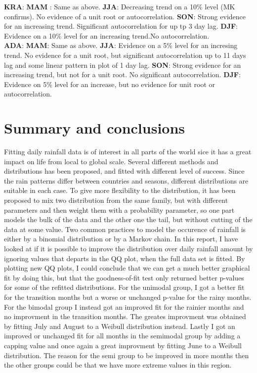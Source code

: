 \documentclass{article}
\begin{document}
	{\Large\textbf{KRA}}: \textbf{MAM} : Same as above. \textbf{JJA}: Decreasing trend on a 10\% level (MK confirms). No evidence of a unit root or autocorrelation. \textbf{SON}: Strong evidence for an increasing trend. Significant autocorrelation for up tp 3 day lag. \textbf{DJF}: Evidence on a 10\% level for an increasing trend.No autocorrelation. \\
	
	{\Large\textbf{ADA}}: \textbf{MAM}: Same as above. \textbf{JJA}: Evidence on a 5\% level for an incresing trend. No evidence for a unit root, but significant autocorrelation up to 11 days lag and some linear pattern in plot of 1 day lag. \textbf{SON}: Strong evidence for an increasing trend, but not for a unit root. No significant autocorrelation. \textbf{DJF}: Evidence on 5\% level for an increase, but no evidence for unit root or autocorrelation.  
	

	\section{Summary and conclusions}
	Fitting daily rainfall data is of interest in all parts of the world sice it has a great impact on life from local to global scale. Several different methods and distributions has been proposed, and fitted with different level of success. Since the rain patterns differ between countries and seasons, different distributions are suitable in each case. To give more flexibility to the distribution, it has been proposed to mix two distribution from the same family, but with different parameters and then weight them with a probability parameter, so one part models the bulk of the data and the other one the tail, but without cutting of the data at some value. Two common practices to model the occurence of rainfall is either by a binomial distribution or by a Markov chain. In this report, I have looked at if it is possible to improve the distribution over daily rainfall amount by ignoring values that departs in the QQ plot, when the full data set is fitted. By plotting new QQ plots, I could conclude that we can get a much better graphical fit by doing this, but that the goodness-of-fit test only returned better p-values for some of the refitted distributions. For the unimodal group, I got a better fit for the transition months but a worse or unchanged p-value for the rainy months. For the bimodal group I instead got an improved fit for the rainier months and no improvment in the transition months. The greates improvment was obtained by fitting July and August to a Weibull distribution instead. Lastly I got an improved or unchanged fit for all months in the semimodal group by adding a capping value and once again a great improvment by fitting June to a Weibull distribution. The reason for the semi group to be improved in more months then the other groups could be that we have more extreme values in this region. 
\end{document}
